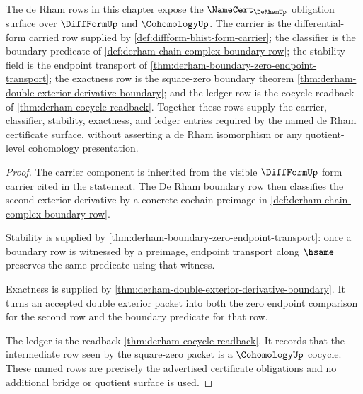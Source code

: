\begin{theorem}
\label{thm:derham-namecert-obligation-surface}
The de Rham rows in this chapter expose the
$\NameCert_{\DeRhamUp}$ obligation surface over $\DiffFormUp$ and
$\CohomologyUp$. The carrier is the differential-form carried row supplied by
\autoref{def:diffform-bhist-form-carrier}; the classifier is the boundary
predicate of \autoref{def:derham-chain-complex-boundary-row}; the stability
field is the endpoint transport of
\autoref{thm:derham-boundary-zero-endpoint-transport}; the exactness row is
the square-zero boundary theorem
\autoref{thm:derham-double-exterior-derivative-boundary}; and the ledger row
is the cocycle readback of \autoref{thm:derham-cocycle-readback}. Together
these rows supply the carrier, classifier, stability, exactness, and ledger
entries required by the named de Rham certificate surface, without asserting a
de Rham isomorphism or any quotient-level cohomology presentation.
\end{theorem}
\begin{proof}
The carrier component is inherited from the visible $\DiffFormUp$ form
carrier cited in the statement. The De Rham boundary row then classifies the
second exterior derivative by a concrete cochain preimage in
\autoref{def:derham-chain-complex-boundary-row}.

Stability is supplied by
\autoref{thm:derham-boundary-zero-endpoint-transport}: once a boundary row is
witnessed by a preimage, endpoint transport along $\hsame$ preserves the same
predicate using that witness.

Exactness is supplied by
\autoref{thm:derham-double-exterior-derivative-boundary}. It turns an accepted
double exterior packet into both the zero endpoint comparison for the second
row and the boundary predicate for that row.

The ledger is the readback
\autoref{thm:derham-cocycle-readback}. It records that the intermediate row
seen by the square-zero packet is a $\CohomologyUp$ cocycle. These named rows
are precisely the advertised certificate obligations and no additional bridge
or quotient surface is used.
\end{proof}

